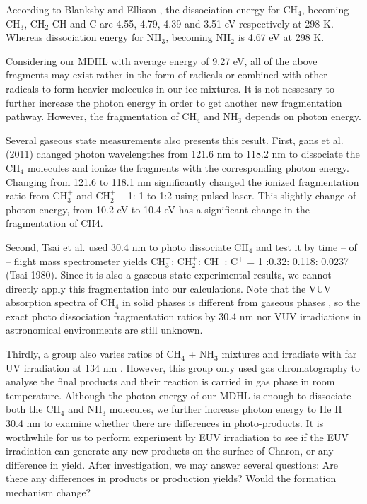 According to Blanksby and Ellison \cite{blanksby2003bond}, the dissociation energy for CH$_4$, becoming CH$_3$, CH$_2$ CH and C are 4.55, 4.79, 4.39 and 3.51 eV respectively at 298 K. Whereas dissociation energy for NH$_3$, becoming NH$_2$ is 4.67 eV at 298 K.

Considering our MDHL with average energy of 9.27 eV, all of the above fragments may exist rather in the form of radicals or combined with other radicals to form heavier molecules in our ice mixtures. It is not nessesary to further increase the photon energy in order to get another new fragmentation pathway. However, the fragmentation of CH$_4$ and NH$_3$ depends on photon energy.

Several gaseous state measurements also presents this result. First, gans et al. (2011) \cite{gans2011photolysis} changed photon wavelengthes from 121.6 nm to 118.2 nm to dissociate the CH$_4$ molecules and ionize the fragments with the corresponding photon energy. Changing from 121.6 to 118.1 nm significantly changed the ionized fragmentation ratio from CH$_3^+$ and CH$_2^+$ ~ 1: 1 to 1:2 using pulsed laser. This slightly change of photon energy, from 10.2 eV to 10.4 eV has a significant change in the fragmentation of CH4.

Second, Tsai et al. \cite{tsai1980mass} used 30.4 nm to photo dissociate CH$_4$ and test it by time – of – flight mass spectrometer yields CH$_3^+$: CH$_2^+$: CH$^+$: C$^+$ = 1 :0.32: 0.118: 0.0237 (Tsai 1980). Since it is also a gaseous state experimental results, we cannot directly apply this fragmentation into our calculations. Note that the VUV absorption spectra of CH$_4$ in solid phases is different from gaseous phases \cite{cruz2014vacuum}, so the exact photo dissociation fragmentation ratios by 30.4 nm nor VUV irradiations in astronomical environments are still unknown.

Thirdly, a group also varies ratios of CH$_4$ + NH$_3$ mixtures and irradiate with far UV irradiation at 134 nm \cite{bossard1980far}. However, this group only used gas chromatography to analyse the final products and their reaction is carried in gas phase in room temperature. Although the photon energy of our MDHL is enough to dissociate both the CH$_4$ and NH$_3$ molecules, we further increase photon energy to He II 30.4 nm to examine whether there are differences in photo-products. It is worthwhile for us to perform experiment by EUV irradiation to see if the EUV irradiation can generate any new products on the surface of Charon, or any difference in yield. After investigation, we may answer several questions: Are there any differences in products or production yields? Would the formation mechanism change?


